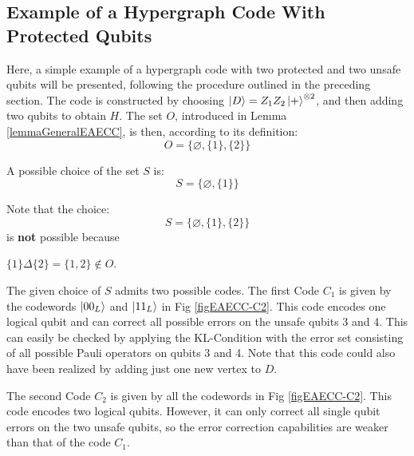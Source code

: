 \documentclass[12pt]{iopart}
\begin{document}
\subsection{Example of a Hypergraph Code With Protected Qubits}

Here, a simple example of a hypergraph code with two protected and two unsafe qubits will be presented, following the procedure outlined in the preceding section.
The code is constructed by choosing $\ket{D} = Z_1Z_2\ket{+}^{\otimes 2}$, and then adding two qubits to obtain $H$.
The set $O$, introduced in Lemma \ref{lemmaGeneralEAECC}, is then, according to its definition:
\begin{equation}
O = \{ \varnothing , \{1\} , \{2\}  \}
\end{equation}

A possible choice of the set $S$ is:
\begin{equation}
S = \{ \varnothing, \{1\}\}
\end{equation}

Note that the choice: 
\begin{equation}
S = \{ \varnothing, \{1\},\{2\}\}
\end{equation}
is \textbf{not} possible because

$\{1\} \Delta \{2\} = \{1,2\} \notin O$.

The given choice of $S$ admits two possible codes. 
The first Code $C_1$ is given by the codewords $\ket{00_L}$ and $\ket{11_L}$ in Fig \ref{figEAECC-C2}. 
This code encodes one logical qubit and can correct all possible errors on the unsafe qubits 3 and 4. This can easily be checked by applying the KL-Condition with the error set consisting of all possible Pauli operators on qubits 3 and 4.
Note that this code could also have been realized by adding just one new vertex to $D$.

The second Code $C_2$ is given by all the codewords in Fig \ref{figEAECC-C2}.
This code encodes two logical qubits. However, it can only correct all single qubit errors on the two unsafe qubits, so the error correction capabilities are weaker than that of the code $C_1$.
\end{document}
